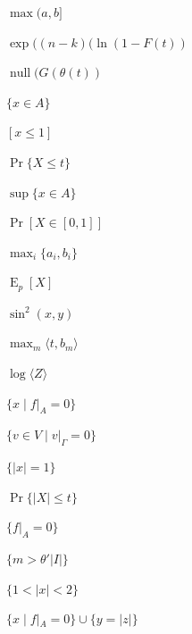 \documentclass{article}
\begin{document}
$\max(a,b]$

$\exp((n-k)(\ln(1-F(t))$

$\operatorname{null}(G(\theta(t))$

$\{x\in A\}$

$[x\le 1]$

$\Pr\{X\le t\}$

$\sup\{x\in A\}$

$\Pr[X\in[0,1]]$

$\max_{i}\{a_i,b_i\}$

$\operatorname{E}_{p}[X]$

$\sin^2(x,y)$

$\max_m\langle t,b_m\rangle$

$\log\langle Z\rangle$

$\{x\mid f|_{A}=0\}$

$\{v\in V\;|\;v|_{\Gamma}=0\}$

$\{|x|=1\}$

$\Pr\{|X|\le t\}$

$\{f|_{A}=0\}$

$\{m>\theta'|I|\}$

$\{1<|x|<2\}$

$\{x\mid f|_{A}=0\}\cup\{y=|z|\}$
\end{document}
